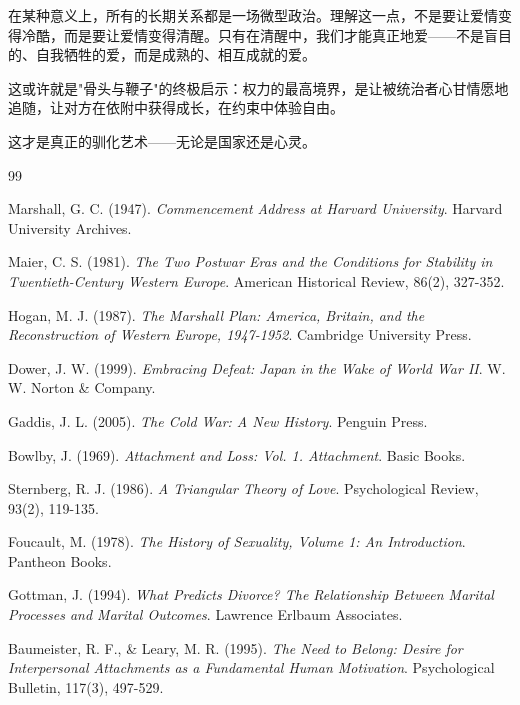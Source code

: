 \documentclass[12pt,a4paper]{article}
\begin{document}
在某种意义上，所有的长期关系都是一场微型政治。理解这一点，不是要让爱情变得冷酷，而是要让爱情变得清醒。只有在清醒中，我们才能真正地爱——不是盲目的、自我牺牲的爱，而是成熟的、相互成就的爱。

这或许就是"骨头与鞭子"的终极启示：权力的最高境界，是让被统治者心甘情愿地追随，让对方在依附中获得成长，在约束中体验自由。

这才是真正的驯化艺术——无论是国家还是心灵。

\newpage
\begin{thebibliography}{99}

Marshall, G. C. (1947). \textit{Commencement Address at Harvard University}. Harvard University Archives.

Maier, C. S. (1981). \textit{The Two Postwar Eras and the Conditions for Stability in Twentieth-Century Western Europe}. American Historical Review, 86(2), 327-352.

Hogan, M. J. (1987). \textit{The Marshall Plan: America, Britain, and the Reconstruction of Western Europe, 1947-1952}. Cambridge University Press.

Dower, J. W. (1999). \textit{Embracing Defeat: Japan in the Wake of World War II}. W. W. Norton \& Company.

Gaddis, J. L. (2005). \textit{The Cold War: A New History}. Penguin Press.

Bowlby, J. (1969). \textit{Attachment and Loss: Vol. 1. Attachment}. Basic Books.

Sternberg, R. J. (1986). \textit{A Triangular Theory of Love}. Psychological Review, 93(2), 119-135.

Foucault, M. (1978). \textit{The History of Sexuality, Volume 1: An Introduction}. Pantheon Books.

Gottman, J. (1994). \textit{What Predicts Divorce? The Relationship Between Marital Processes and Marital Outcomes}. Lawrence Erlbaum Associates.

Baumeister, R. F., \& Leary, M. R. (1995). \textit{The Need to Belong: Desire for Interpersonal Attachments as a Fundamental Human Motivation}. Psychological Bulletin, 117(3), 497-529.

\end{thebibliography}
\end{document}
